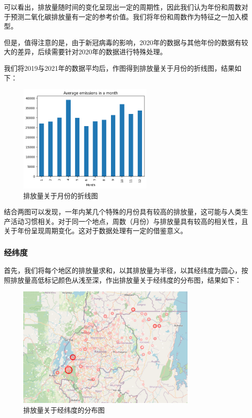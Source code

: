 \documentclass{ctexart}
\begin{document}
可以看出，排放量随时间的变化呈现出一定的周期性，因此我们认为年份和周数对于预测二氧化碳排放量有一定的参考价值。我们将年份和周数作为特征之一加入模型。

但是，值得注意的是，由于新冠病毒的影响，2020年的数据与其他年份的数据有较大的差异，后续需要针对2020年的数据进行特殊处理。

我们将2019与2021年的数据平均后，作图得到排放量关于月份的折线图，结果如下：

\begin{figure}[H]
      \centering
      \includegraphics[width=0.6\textwidth]{output3.png}
      \caption{排放量关于月份的折线图}
\end{figure}

结合两图可以发现，一年内某几个特殊的月份具有较高的排放量，这可能与人类生产活动习惯相关。对于同一个地点，周数（月份）与排放量具有较高的相关性，且关于年份呈现周期变化。这对于数据处理有一定的借鉴意义。

\subsubsection{经纬度}

首先，我们将每个地区的排放量求和，以其排放量为半径，以其经纬度为圆心，按照排放量高低标记颜色从浅至深，作出排放量关于经纬度的分布图，结果如下：

\begin{figure}[H]
      \centering
      \includegraphics[width=0.8\textwidth]{output4.png}
      \caption{排放量关于经纬度的分布图}
\end{figure}
\end{document}
